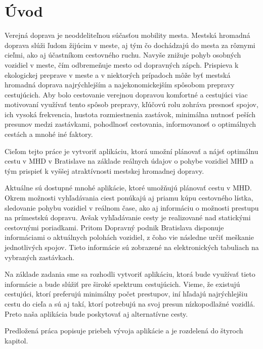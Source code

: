\chapter*{Úvod} %

Verejná doprava je neoddeliteľnou súčasťou mobility mesta. Mestská hromadná doprava slúži ľudom žijúcim v meste, aj tým čo dochádzajú do mesta za rôznymi cieľmi, ako aj účastníkom cestovného ruchu. Navyše znižuje pohyb osobných vozidiel v meste, čím odbremeňuje mesto od dopravných zápch. Prispieva k ekologickej preprave v meste a v niektorých prípadoch môže byť mestská hromadná doprava najrýchlejším a najekonomickejším spôsobom prepravy cestujúcich. Aby bolo cestovanie verejnou dopravou komfortné a cestujúci viac motivovaní využívať tento spôsob prepravy, kľúčovú rolu zohráva presnosť spojov, ich vysoká frekvencia, hustota rozmiestnenia zastávok, minimálna nutnosť peších presunov medzi zastávkami, pohodlnosť cestovania, informovanosť o optimálnych cestách a mnohé iné faktory.

Cieľom tejto práce je vytvoriť aplikáciu, ktorá umožní plánovať a nájsť optimálnu cestu v MHD v Bratislave na základe reálnych údajov o pohybe vozidiel MHD a tým prispieť k vyššej atraktívnosti mestskej hromadnej dopravy. 

Aktuálne sú dostupné mnohé aplikácie, ktoré umožňujú plánovať cestu v MHD. Okrem možnosti vyhľadávania ciest ponúkajú aj priamu kúpu cestovného lístka, sledovanie pohybu vozidiel v reálnom čase, ako aj informáciu o možnosti prestupu na prímestskú dopravu. Avšak vyhľadávanie cesty je realizované nad statickými cestovnými poriadkami. Pritom Dopravný podnik Bratislava disponuje informáciami o aktuálnych polohách vozidiel, z čoho vie následne určiť meškanie jednotlivých spojov. Tieto informácie sú zobrazené na elektronických tabuliach na vybraných zastávkach.

Na základe zadania sme sa rozhodli vytvoriť aplikáciu, ktorá bude využívať tieto informácie a bude slúžiť pre široké spektrum cestujúcich. Vieme, že existujú cestujúci, ktorí preferujú minimálny počet prestupov, iní hľadajú najrýchlejšiu cestu do cieľa a sú aj takí, ktorí potrebujú na svoj presun nízkopodlažné vozidlá. Preto naša aplikácia bude poskytovať aj alternatívne cesty.

Predložená práca popisuje priebeh vývoja aplikácie a je rozdelená do štyroch kapitol. 

